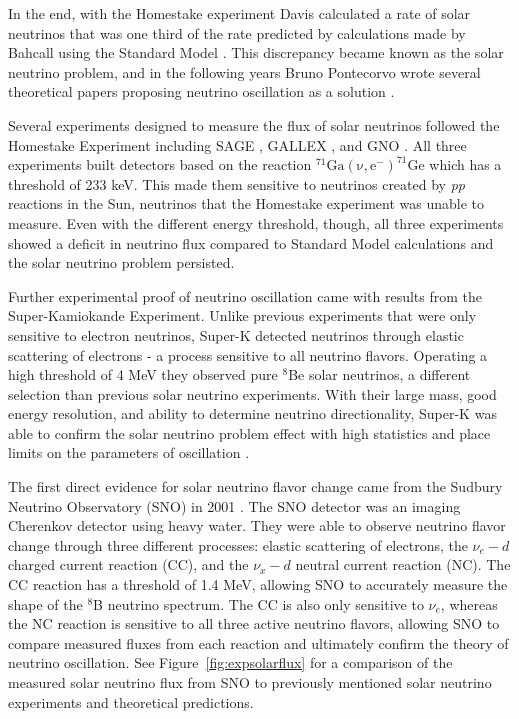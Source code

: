 In the end, with the Homestake experiment Davis calculated a rate of solar neutrinos that was one third of the rate predicted by calculations made by Bahcall using the Standard Model \cite{Davis}. 
This discrepancy became known as the solar neutrino problem, and in the following years Bruno Pontecorvo wrote several theoretical papers proposing neutrino oscillation as a solution \cite{Pont1968,Pont1977}.

Several experiments designed to measure the flux of solar neutrinos followed the Homestake Experiment including SAGE \cite{Abdurashitov:1994bc}, GALLEX \cite{Hampel:1998xg}, and GNO \cite{Altmann:2000ft,Bellotti:2001ta}.
All three experiments built detectors based on the reaction $\mathrm{^{71}Ga(\nu,e^{-})^{71}Ge}$ which has a threshold of 233 keV.
This made them sensitive to neutrinos created by \textit{pp} reactions in the Sun, neutrinos that the Homestake experiment was unable to measure.
Even with the different energy threshold, though, all three experiments showed a deficit in neutrino flux compared to Standard Model calculations and the solar neutrino problem persisted.

Further experimental proof of neutrino oscillation came with results from the Super-Kamiokande Experiment. Unlike previous experiments that were only sensitive to electron neutrinos, Super-K detected neutrinos through elastic scattering of electrons - a process sensitive to all neutrino flavors.
Operating a high threshold of 4 MeV they observed pure $^{8}$Be solar neutrinos, a different selection than previous solar neutrino experiments.
With their large mass, good energy resolution, and ability to determine neutrino directionality, Super-K was able to confirm the solar neutrino problem effect with high statistics and place limits on the parameters of oscillation \cite{SuperKOsc}.

The first direct evidence for solar neutrino flavor change came from the Sudbury Neutrino Observatory (SNO) in 2001 \cite{SNO,SNOOsc}. 
The SNO detector was an imaging Cherenkov detector using heavy water.
They were able to observe neutrino flavor change through three different processes: elastic scattering of electrons, the $\nu_e - d$ charged current reaction (CC), and the $\nu_x - d$ neutral current reaction (NC).
The CC reaction has a threshold of 1.4 MeV, allowing SNO to accurately measure the shape of the $^{8}$B neutrino spectrum.
The CC is also only sensitive to $\nu_{e}$, whereas the NC reaction is sensitive to all three active neutrino flavors, allowing SNO to compare measured fluxes from each reaction and ultimately confirm the theory of neutrino oscillation.
See Figure~\ref{fig:expsolarflux} for a comparison of the measured solar neutrino flux from SNO to previously mentioned solar neutrino experiments and theoretical predictions.

